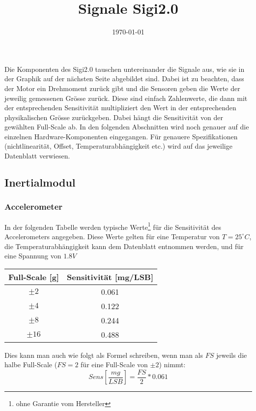 \documentclass[a4paper, 12pt]{article}
\title{Signale Sigi2.0}
\date{\today}
\begin{document}
\maketitle

Die Komponenten des Sigi2.0 tauschen untereinander die Signale aus, wie sie in der Graphik auf der nächsten Seite abgebildet sind. Dabei ist zu beachten, dass der Motor ein Drehmoment zurück gibt und die Sensoren geben die Werte der jeweilig gemessenen Grösse zurück. Diese sind einfach Zahlenwerte, die dann mit der entsprechenden Sensitivität multipliziert den Wert in der entsprechenden physikalischen Grösse zurückgeben. Dabei hängt die Sensitivität von der gewählten Full-Scale ab. In den folgenden Abschnitten wird noch genauer auf die einzelnen Hardware-Komponenten eingegangen. Für genauere Spezifikationen (nichtlinearität, Offset, Temperaturabhängigkeit etc.) wird auf das jeweilige Datenblatt verwiesen.

\subsection*{Inertialmodul}
\subsubsection*{Accelerometer}
In der folgenden Tabelle werden typische Werte\footnote{ohne Garantie vom Hersteller} für die Sensitivität des Accelerometers angegeben.
Diese Werte gelten für eine Temperatur von $T = 25^\circ C$, die Temperaturabhängigkeit kann dem Datenblatt entnommen werden, und für eine Spannung von $1.8 V$
\begin{center}
	\begin{tabular}{c | c}
	Full-Scale [g] & Sensitivität [mg/LSB]\\\hline
	$\pm 2$ & 0.061\\
	$\pm 4$ & 0.122\\
	$\pm 8$ & 0.244\\
	$\pm 16$ & 0.488
\end{tabular}
\end{center}
Dies kann man auch wie folgt als Formel schreiben, wenn man als $FS$ jeweils die halbe Full-Scale ($FS = 2$ für eine Full-Scale von $\pm 2$) nimmt:\\
\[Sens \left[\frac{mg}{LSB}\right] = \frac{FS}{2}*0.061\]
\end{document}
